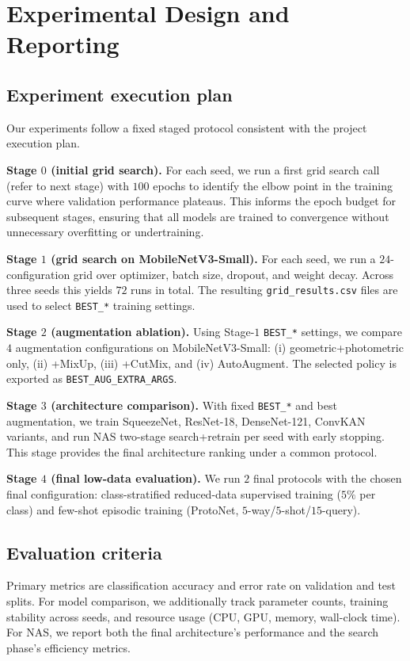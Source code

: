 \documentclass[cameraready]{Interspeech}
\begin{document}
\section{Experimental Design and Reporting}
\subsection{Experiment execution plan}
\label{sec:execution_plan}
Our experiments follow a fixed staged protocol consistent with the project execution plan.

\textbf{Stage $0$ (initial grid search).} For each seed, we run a first grid search call (refer to next stage) with $100$ epochs to identify the elbow point in the training curve where validation performance plateaus. This informs the epoch budget for subsequent stages, ensuring that all models are trained to convergence without unnecessary overfitting or undertraining.

\textbf{Stage $1$ (grid search on MobileNetV3-Small).} For each seed, we run a $24$-configuration grid over optimizer, batch size, dropout, and weight decay. Across three seeds this yields $72$ runs in total. The resulting \texttt{grid\_results.csv} files are used to select \texttt{BEST\_*} training settings.

\textbf{Stage $2$ (augmentation ablation).} Using Stage-$1$ \texttt{BEST\_*} settings, we compare $4$ augmentation configurations on MobileNetV3-Small: (i) geometric+photometric only, (ii) +MixUp, (iii) +CutMix, and (iv)
AutoAugment. The selected policy is exported as \texttt{BEST\_AUG\_EXTRA\_ARGS}.

\textbf{Stage $3$ (architecture comparison).} With fixed \texttt{BEST\_*} and best augmentation, we train SqueezeNet, ResNet-18, DenseNet-121, ConvKAN variants, and run NAS two-stage search+retrain per seed with early stopping. This stage provides the final architecture ranking under a common protocol.

\textbf{Stage $4$ (final low-data evaluation).} We run $2$ final protocols with the chosen final configuration: class-stratified reduced-data supervised training ($5\%$ per class) and few-shot episodic training (ProtoNet, $5$-way/$5$-shot/$15$-query).

\subsection{Evaluation criteria}
Primary metrics are classification accuracy and error rate on validation and test splits. For model comparison, we additionally track parameter counts, training stability across seeds, and resource usage (CPU, GPU, memory, wall-clock time). For NAS, we report both the final architecture's performance and the search phase's efficiency metrics.
\end{document}
